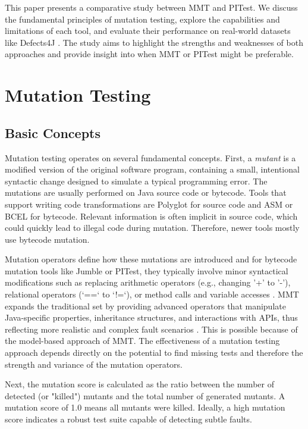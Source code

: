\documentclass[12pt,a4paper]{article}
\begin{document}
This paper presents a comparative study between MMT and PITest. We discuss
the fundamental principles of mutation testing, explore the capabilities and
limitations of each tool, and evaluate their performance on real-world
datasets like Defects4J \cite{just_defects4j_2014}. The study aims to
highlight the strengths and weaknesses of both approaches and provide insight
into when MMT or PITest might be preferable.

\newpage
\section{Mutation Testing}

\subsection{Basic Concepts}
Mutation testing operates on several fundamental concepts.
First, a \textit{mutant} is a modified version of the original software
program, containing a small, intentional syntactic change designed to simulate
a typical programming error. The mutations are usually performed on Java
source code or bytecode. Tools that support writing code transformations are
Polyglot for source code and ASM or BCEL for bytecode. Relevant information
is often implicit in source code, which could quickly lead to illegal code
during mutation. Therefore, newer tools mostly use bytecode mutation.

Mutation operators define how these mutations are introduced and for
bytecode mutation tools like Jumble or PITest, they typically involve minor
syntactical modifications such as replacing arithmetic operators (e.g.,
changing '+' to '-'), relational operators (`==` to `!=`), or method calls
and variable accesses \cite{offutt_mutation_2001}. MMT expands the
traditional set by providing advanced operators that manipulate Java-specific
properties, inheritance structures, and interactions with APIs, thus
reflecting more realistic and complex fault scenarios
\cite{bockisch_mmt_2024}. This is possible because of the model-based
approach of MMT\@. The effectiveness of a mutation testing approach depends
directly on the potential to find missing tests and therefore the strength
and variance of the mutation operators.

Next, the mutation score is calculated as the ratio between the number of
detected (or "killed") mutants and the total number of generated mutants. A
mutation score of 1.0 means all mutants were killed. Ideally, a high
mutation score indicates a robust test suite capable of detecting subtle
faults.
\end{document}

